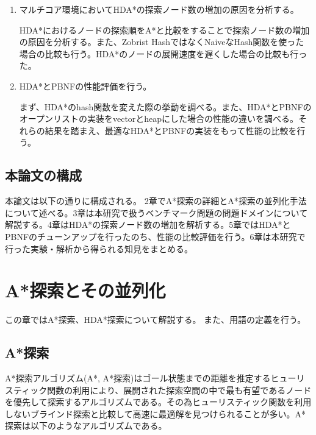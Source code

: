 \documentclass{jsarticle}
\begin{document}
\begin{enumerate}
\item マルチコア環境においてHDA*の探索ノード数の増加の原因を分析する。

HDA*におけるノードの探索順をA*と比較をすることで探索ノード数の増加の原因を分析する。また、Zobrist HashではなくNaiveなHash関数を使った場合の比較も行う。HDA*のノードの展開速度を遅くした場合の比較も行った。
\newline
\item HDA*とPBNFの性能評価を行う。

まず、HDA*のhash関数を変えた際の挙動を調べる。また、HDA*とPBNFのオープンリストの実装をvectorとheapにした場合の性能の違いを調べる。それらの結果を踏まえ、最適なHDA*とPBNFの実装をもって性能の比較を行う。
\end{enumerate}


\subsection{本論文の構成}

本論文は以下の通りに構成される。
2章でA*探索の詳細とA*探索の並列化手法について述べる。3章は本研究で扱うベンチマーク問題の問題ドメインについて解説する。4章はHDA*の探索ノード数の増加を解析する。5章ではHDA*とPBNFのチューンアップを行ったのち、性能の比較評価を行う。6章は本研究で行った実験・解析から得られる知見をまとめる。

\section{A*探索とその並列化}
\label{ch:define}

この章ではA*探索、HDA*探索について解説する。
また、用語の定義を行う。

\subsection{A*探索}

A*探索アルゴリズム(A*, A*探索)はゴール状態までの距離を推定するヒューリスティック関数の利用により、展開された探索空間の中で最も有望であるノードを優先して探索するアルゴリズムである\cite{Hart1968}。その為ヒューリスティック関数を利用しないブラインド探索と比較して高速に最適解を見つけられることが多い。A*探索は以下のようなアルゴリズムである。
\end{document}
